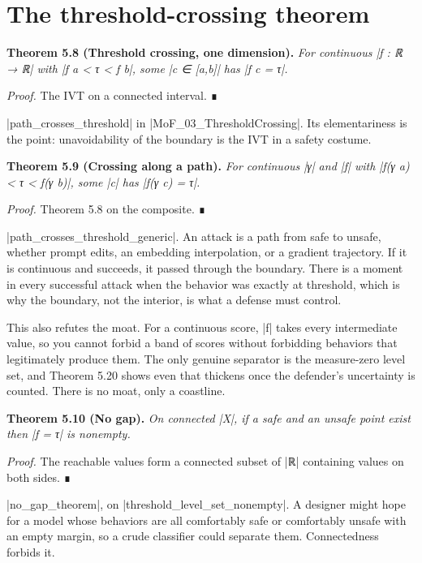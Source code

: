 \documentclass{memoir}
\begin{document}
\section{The threshold-crossing theorem}\label{Two--Schemas--of--Impossibility-005F-005F-005F--Machine--Checked--Limits--of--Trustworthy--Machine--Learning-005F-005F-005F--and--Why--They--Tighten--with--Capability----The--Geometry--of--Attacks----The--threshold--crossing--theorem}

\textbf{Theorem 5.8 (Threshold crossing, one dimension).} \emph{For continuous \LeanVerb|f : ℝ → ℝ| with
\LeanVerb|f a < τ < f b|, some \LeanVerb|c ∈ [a,b]| has \LeanVerb|f c = τ|.}

\emph{Proof.} The IVT on a connected interval. ∎

\LeanVerb|path_crosses_threshold| in \LeanVerb|MoF_03_ThresholdCrossing|. Its elementariness is
the point: unavoidability of the boundary is the IVT in a safety costume.

\textbf{Theorem 5.9 (Crossing along a path).} \emph{For continuous \LeanVerb|γ| and \LeanVerb|f| with
\LeanVerb|f(γ a) < τ < f(γ b)|, some \LeanVerb|c| has \LeanVerb|f(γ c) = τ|.}

\emph{Proof.} Theorem 5.8 on the composite. ∎

\LeanVerb|path_crosses_threshold_generic|. An attack is a path from safe to unsafe,
whether prompt edits, an embedding interpolation, or a gradient trajectory. If
it is continuous and succeeds, it passed through the boundary. There is a moment
in every successful attack when the behavior was exactly at threshold, which is
why the boundary, not the interior, is what a defense must control.

This also refutes the moat. For a continuous score, \LeanVerb|f| takes every intermediate
value, so you cannot forbid a band of scores without forbidding behaviors that
legitimately produce them. The only genuine separator is the measure-zero level
set, and Theorem 5.20 shows even that thickens once the defender's uncertainty
is counted. There is no moat, only a coastline.

\textbf{Theorem 5.10 (No gap).} \emph{On connected \LeanVerb|X|, if a safe and an unsafe point exist then
\LeanVerb|f = τ| is nonempty.}

\emph{Proof.} The reachable values form a connected subset of \LeanVerb|ℝ| containing values on both
sides. ∎

\LeanVerb|no_gap_theorem|, on \LeanVerb|threshold_level_set_nonempty|. A designer might hope for a
model whose behaviors are all comfortably safe or comfortably unsafe with an
empty margin, so a crude classifier could separate them. Connectedness forbids
it.
\end{document}
